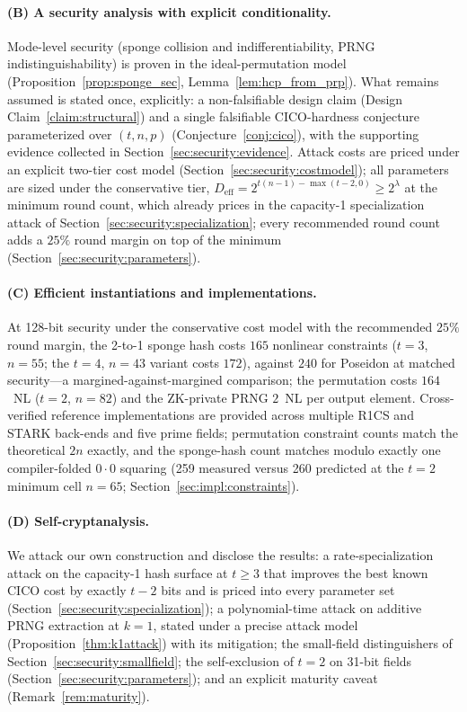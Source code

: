 \documentclass[11pt,a4paper]{article}
\theoremstyle{definition}
\begin{document}
\paragraph{(B) A security analysis with explicit conditionality.}
Mode-level security (sponge collision and indifferentiability, PRNG
indistinguishability) is proven in the ideal-permutation model
(Proposition~\ref{prop:sponge_sec}, Lemma~\ref{lem:hcp_from_prp}).
What remains assumed is stated once, explicitly: a non-falsifiable
design claim (Design Claim~\ref{claim:structural}) and a single
falsifiable CICO-hardness conjecture parameterized over $(t, n, p)$
(Conjecture~\ref{conj:cico}), with the supporting evidence collected
in Section~\ref{sec:security:evidence}. Attack costs are priced under
an explicit two-tier cost model
(Section~\ref{sec:security:costmodel}); all parameters are sized
under the conservative tier,
$D_{\mathrm{eff}} = 2^{t(n-1)-\max(t-2,0)} \ge 2^{\lambda}$ at the
minimum round count, which already prices in the capacity-1
specialization attack of
Section~\ref{sec:security:specialization}; every recommended round
count adds a $25\%$ round margin on top of the minimum
(Section~\ref{sec:security:parameters}).

\paragraph{(C) Efficient instantiations and implementations.}
At 128-bit security under the conservative cost model with the
recommended $25\%$ round margin, the 2-to-1 sponge hash costs $165$
nonlinear constraints ($t=3$, $n=55$; the $t=4$, $n=43$ variant costs
$172$), against $240$ for Poseidon at matched security---a
margined-against-margined comparison; the permutation costs $164$~NL
($t=2$, $n=82$) and the ZK-private PRNG $2$~NL per output element.
Cross-verified reference implementations are provided across multiple
R1CS and STARK back-ends and five prime fields; permutation
constraint counts match the theoretical $2n$ exactly, and the
sponge-hash count matches modulo exactly one compiler-folded
$0\!\cdot\!0$ squaring (259 measured versus 260 predicted at the
$t=2$ minimum cell $n=65$;
Section~\ref{sec:impl:constraints}).

\paragraph{(D) Self-cryptanalysis.}
We attack our own construction and disclose the results: a
rate-specialization attack on the capacity-1 hash surface at
$t \ge 3$ that improves the best known CICO cost by exactly
$t - 2$ bits and is priced into every parameter set
(Section~\ref{sec:security:specialization}); a polynomial-time attack
on additive PRNG extraction at $k=1$, stated under a precise attack
model (Proposition~\ref{thm:k1attack}) with its mitigation; the small-field
distinguishers of Section~\ref{sec:security:smallfield}; the
self-exclusion of $t=2$ on 31-bit fields
(Section~\ref{sec:security:parameters}); and an explicit maturity
caveat (Remark~\ref{rem:maturity}).
\end{document}
